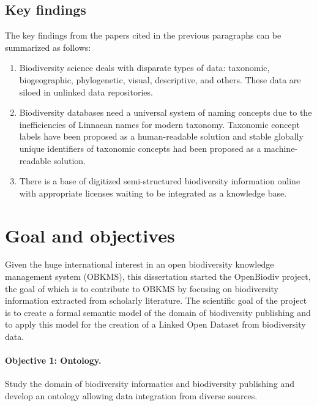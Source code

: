 \subsection*{Key findings}

The key findings from the papers cited in the previous paragraphs can be summarized as follows:

\begin{enumerate}
  
\item{Biodiversity science deals with disparate types of data: taxonomic, biogeographic, phylogenetic, visual, descriptive, and others. These data are siloed in unlinked data repositories.}
  
\item{Biodiversity databases need a universal system of naming concepts due to the inefficiencies of Linnaean names for modern taxonomy. Taxonomic concept labels have been proposed as a human-readable solution and stable globally unique identifiers of taxonomic concepts had been proposed as a machine-readable solution.}

\item{There is a base of digitized semi-structured biodiversity information online with appropriate licenses waiting to be integrated as a knowledge base.}
\end{enumerate}


\section*{Goal and objectives}

Given the huge international interest in an open biodiversity knowledge management system (OBKMS), this dissertation started the OpenBiodiv project, the goal of which is to contribute to OBKMS by focusing on biodiversity information extracted from scholarly literature. The scientific goal of the project is to create a formal semantic model of the domain of biodiversity publishing and to apply this model for the creation of a Linked Open Dataset from biodiversity data.

\paragraph{Objective 1: Ontology.} Study the domain of biodiversity informatics and biodiversity publishing and develop an ontology allowing data integration from diverse sources.

